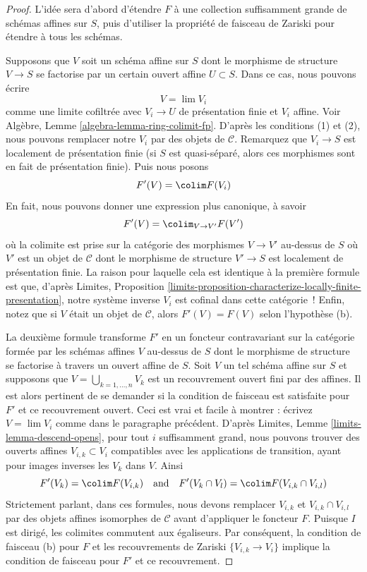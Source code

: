 \begin{proof}
L'idée sera d'abord d'étendre $F$ à une collection suffisamment grande de schémas affines sur $S$, puis d'utiliser la propriété de faisceau de Zariski pour étendre à tous les schémas.

\medskip\noindent
Supposons que $V$ soit un schéma affine sur $S$ dont le morphisme de structure $V \to S$ se factorise par un certain ouvert affine $U \subset S$. Dans ce cas, nous pouvons écrire
$$
V = \lim V_i
$$
comme une limite cofiltrée avec $V_i \to U$ de présentation finie et $V_i$ affine. Voir Algèbre, Lemme \ref{algebra-lemma-ring-colimit-fp}. D'après les conditions (1) et (2), nous pouvons remplacer notre $V_i$ par des objets de $\mathcal{C}$. Remarquez que $V_i \to S$ est localement de présentation finie (si $S$ est quasi-séparé, alors ces morphismes sont en fait de présentation finie). Puis nous posons
$$
F'(V) = \colim F(V_i)
$$
En fait, nous pouvons donner une expression plus canonique, à savoir
$$
F'(V) = \colim_{V \to V'} F(V')
$$
où la colimite est prise sur la catégorie des morphismes $V \to V'$ au-dessus de $S$ où $V'$ est un objet de $\mathcal{C}$ dont le morphisme de structure $V' \to S$ est localement de présentation finie. La raison pour laquelle cela est identique à la première formule est que, d'après Limites, Proposition \ref{limits-proposition-characterize-locally-finite-presentation}, notre système inverse $V_i$ est cofinal dans cette catégorie ! Enfin, notez que si $V$ était un objet de $\mathcal{C}$, alors $F'(V) = F(V)$ selon l'hypothèse (b).

\medskip\noindent
La deuxième formule transforme $F'$ en un foncteur contravariant sur la catégorie formée par les schémas affines $V$ au-dessus de $S$ dont le morphisme de structure se factorise à travers un ouvert affine de $S$. Soit $V$ un tel schéma affine sur $S$ et supposons que $V = \bigcup_{k = 1, \ldots, n} V_k$ est un recouvrement ouvert fini par des affines. Il est alors pertinent de se demander si la condition de faisceau est satisfaite pour $F'$ et ce recouvrement ouvert. Ceci est vrai et facile à montrer : écrivez $V = \lim V_i$ comme dans le paragraphe précédent. D'après Limites, Lemme \ref{limits-lemma-descend-opens}, pour tout $i$ suffisamment grand, nous pouvons trouver des ouverts affines $V_{i, k} \subset V_i$ compatibles avec les applications de transition, ayant pour images inverses les $V_k$ dans $V$. Ainsi
$$
F'(V_k) = \colim F(V_{i, k})
\quad\text{and}\quad
F'(V_k \cap V_l) = \colim F(V_{i, k} \cap V_{i, l})
$$
Strictement parlant, dans ces formules, nous devons remplacer $V_{i, k}$ et $V_{i, k} \cap V_{i, l}$ par des objets affines isomorphes de $\mathcal{C}$ avant d'appliquer le foncteur $F$. Puisque $I$ est dirigé, les colimites commutent aux égaliseurs. Par conséquent, la condition de faisceau (b) pour $F$ et les recouvrements de Zariski $\{V_{i, k} \to V_i\}$ implique la condition de faisceau pour $F'$ et ce recouvrement.


\end{proof}
